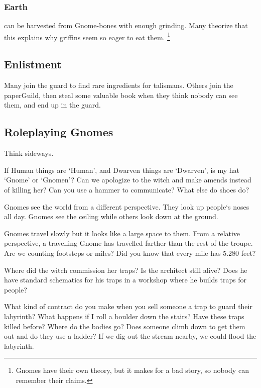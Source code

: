 \begin{multicols}{2}
\subsubsection{Earth }
can be harvested from Gnome-bones with enough grinding.
Many theorize that this explains why griffins seem so eager to eat them.%
\footnote{Gnomes have their own theory, but it makes for a bad story, so nobody can remember their claims.}

\subsection{Enlistment}

Many join the \gls{guard} to find rare \glspl{ingredient} for \glspl{talisman}.
Others join the \gls{paperGuild}, then steal some valuable book when they think nobody can see them, and end up in the \gls{guard}.

\subsection{Roleplaying Gnomes}

{\raggedleft Think sideways.\par}
\noindent
If Human things are `Human', and Dwarven things are `Dwarven', is my hat `Gnome' or `Gnomen'?
Can we apologize to the \gls{witch} and make amends instead of killing her?
Can you use a hammer to communicate?
What else do shoes do?

Gnomes see the world from a different perspective.
They look up people`s noses all day.
Gnomes see the ceiling while others look down at the ground.

Gnomes travel slowly but it looks like a large space to them.
From a relative perspective, a travelling Gnome has travelled farther than the rest of the troupe.
Are we counting footsteps or miles?
Did you know that every mile has 5.280 feet?

Where did the \gls{witch} commission her traps?
Is the architect still alive?
Does he have standard schematics for his traps in a workshop where he builds traps for people?

What kind of contract do you make when you sell someone a trap to guard their labyrinth?
What happens if I roll a boulder down the stairs?
Have these traps killed before?
Where do the bodies go?
Does someone climb down to get them out and do they use a ladder?
If we dig out the stream nearby, we could flood the labyrinth.

\end{multicols}

